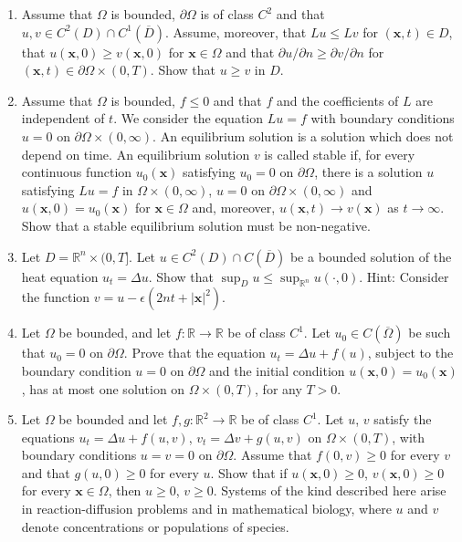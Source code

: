 \begin{enumerate}[label=\thesection.\arabic*.,ref=\thesection.\arabic*,start=22,series=book-problems]

\item\label{ex:parabolic-neumann-comparison} Assume that $\Omega$ is bounded, $\partial\Omega$ is of class $C^2$ and that $u,v\in C^2(D)\cap C^1(\overline D)$. Assume, moreover, that $Lu\leq Lv$ for $(\bm{x},t)\in D$, that $u(\bm{x},0)\geq v(\bm{x},0)$ for $\bm{x}\in\Omega$ and that $\partial u/\partial n\geq\partial v/\partial n$ for $(\bm{x},t)\in\partial\Omega\times(0,T)$. Show that $u\geq v$ in $D$.

\item\label{ex:parabolic-stable-equilibrium-nonnegative} Assume that $\Omega$ is bounded, $f\leq0$ and that $f$ and the coefficients of $L$ are independent of $t$. We consider the equation $Lu=f$ with boundary conditions $u=0$ on $\partial\Omega\times(0,\infty)$. An equilibrium solution is a solution which does not depend on time. An equilibrium solution $v$ is called stable if, for every continuous function $u_0(\bm{x})$ satisfying $u_0=0$ on $\partial\Omega$, there is a solution $u$ satisfying $Lu=f$ in $\Omega\times(0,\infty)$, $u=0$ on $\partial\Omega\times(0,\infty)$ and $u(\bm{x},0)=u_0(\bm{x})$ for $\bm{x}\in\Omega$ and, moreover, $u(\bm{x},t)\to v(\bm{x})$ as $t\to\infty$. Show that a stable equilibrium solution must be non-negative.

\item\label{ex:whole-space-bounded-heat-maximum} Let $D=\mathbb{R}^n\times(0,T]$. Let $u\in C^2(D)\cap C(\overline D)$ be a bounded solution of the heat equation $u_t=\Delta u$. Show that $\sup_Du\leq\sup_{\mathbb{R}^n}u(\cdot,0)$. Hint: Consider the function $v=u-\epsilon(2nt+|\bm{x}|^2)$.

\item\label{ex:semilinear-parabolic-uniqueness} Let $\Omega$ be bounded, and let $f:\mathbb{R}\to\mathbb{R}$ be of class $C^1$. Let $u_0\in C(\overline\Omega)$ be such that $u_0=0$ on $\partial\Omega$. Prove that the equation $u_t=\Delta u+f(u)$, subject to the boundary condition $u=0$ on $\partial\Omega$ and the initial condition $u(\bm{x},0)=u_0(\bm{x})$, has at most one solution on $\Omega\times(0,T)$, for any $T>0$.

\item\label{ex:reaction-diffusion-positivity} Let $\Omega$ be bounded and let $f,g:\mathbb{R}^2\to\mathbb{R}$ be of class $C^1$. Let $u$, $v$ satisfy the equations $u_t=\Delta u+f(u,v)$, $v_t=\Delta v+g(u,v)$ on $\Omega\times(0,T)$, with boundary conditions $u=v=0$ on $\partial\Omega$. Assume that $f(0,v)\geq0$ for every $v$ and that $g(u,0)\geq0$ for every $u$. Show that if $u(\bm{x},0)\geq0$, $v(\bm{x},0)\geq0$ for every $\bm{x}\in\Omega$, then $u\geq0$, $v\geq0$. Systems of the kind described here arise in reaction-diffusion problems and in mathematical biology, where $u$ and $v$ denote concentrations or populations of species.

\end{enumerate}
